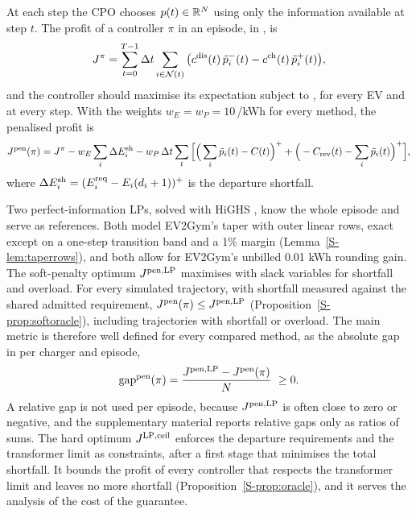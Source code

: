 At each step the CPO chooses $p(t)\in\mathbb R^N$ using only the information available at step $t$.
The profit of a controller $\pi$ in an episode, in \texteuro, is
\begin{equation}\label{eq:objective}
J^{\pi}=\sum_{t=0}^{T-1}\Delta t\sum_{i\in\mathcal N(t)}\big(c^{\mathrm{dis}}(t)\,\tilde p_i^{-}(t)-c^{\mathrm{ch}}(t)\,\tilde p_i^{+}(t)\big),
\end{equation}
and the controller should maximise its expectation subject to ,  for every EV and  at every step.
With the weights $w_E=w_P=10$\,\texteuro/kWh for every method, the penalised profit is
\begin{equation}\label{eq:jpen}
J^{\mathrm{pen}}(\pi)=J^{\pi}-w_E\sum_i\Delta E_i^{\mathrm{sh}}-w_P\,\Delta t\sum_t\Big[\Big(\sum_i\tilde p_i(t)-C(t)\Big)^{+}+\Big(-C_{\mathrm{rev}}(t)-\sum_i\tilde p_i(t)\Big)^{+}\Big],
\end{equation}
where $\Delta E_i^{\mathrm{sh}}=(E^{\mathrm{req}}_i-E_i(d_i+1))^{+}$ is the departure shortfall.

Two perfect-information LPs, solved with HiGHS \cite{huangfu2018parallelizing}, know the whole episode and serve as references.
Both model EV2Gym's taper with outer linear rows, exact except on a one-step transition band and a 1\% margin (Lemma~\ref{S-lem:taperrows}), and both allow for EV2Gym's unbilled 0.01 kWh rounding gain.
The soft-penalty optimum $J^{\mathrm{pen,LP}}$ maximises  with slack variables for shortfall and overload.
For every simulated trajectory, with shortfall measured against the shared admitted requirement, $J^{\mathrm{pen}}(\pi)\le J^{\mathrm{pen,LP}}$ (Proposition~\ref{S-prop:softoracle}), including trajectories with shortfall or overload.
The main metric is therefore well defined for every compared method, as the absolute gap in \texteuro{} per charger and episode,
\begin{equation}\label{eq:gap}
\mathrm{gap}^{\sm{pen}}(\pi)=\frac{J^{\sm{pen,LP}}-J^{\sm{pen}}(\pi)}{N}\ \ge0 .
\end{equation}
A relative gap is not used per episode, because $J^{\mathrm{pen,LP}}$ is often close to zero or negative, and the supplementary material reports relative gaps only as ratios of sums.
The hard optimum $J^{\mathrm{LP,ceil}}$ enforces the departure requirements and the transformer limit as constraints, after a first stage that minimises the total shortfall.
It bounds the profit of every controller that respects the transformer limit and leaves no more shortfall (Proposition~\ref{S-prop:oracle}), and it serves the analysis of the cost of the guarantee.

